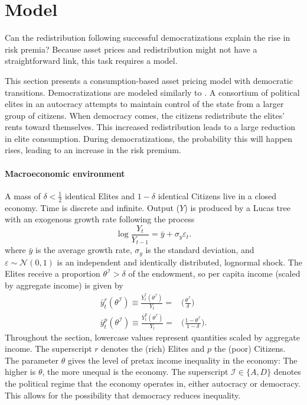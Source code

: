 \section{Model}\label{section:model}
Can the redistribution following successful democratizations explain the rise in risk premia? Because asset prices and redistribution might not have a straightforward link, this task requires a model.

This section presents a consumption-based asset pricing model with democratic transitions. Democratizations are modeled similarly to \cite{Acemoglu2006}.  A consortium of political elites in an autocracy attempts to maintain control of the state from a larger group of citizens. When democracy comes, the citizens redistribute the elites' rents toward themselves. This increased redistribution leads to a large reduction in elite consumption. During democratizations, the probability this will happen rises, leading to an increase in the risk premium.

\paragraph{Macroeconomic environment}
A mass of $\delta<\frac{1}{2}$ identical Elites and $1-\delta$ identical Citizens live in a closed economy.  Time is discrete and infinite.  Output ($Y$) is produced by a Lucas tree with an exogenous growth rate following the process
\begin{equation}
\log \frac{Y_{t}}{Y_{t-1}}=\bar{y}+\sigma_y \varepsilon_{t}.\label{eq:endowment}
\end{equation}
where $\bar{y}$ is the average growth rate, $\sigma_y$ is the standard deviation, and $\varepsilon \sim \mathcal{N}(0,1)$ is an independent and identically distributed, lognormal shock.  The Elites receive a proportion $\theta^\mathcal{I}>\delta$ of the endowment, so per capita income (scaled by aggregate income) is given by
\begin{align}
\bar{y}_{t}^{r}(\theta^{\mathcal{I}}) \equiv \frac{\bar{Y}_{t}^{r}(\theta^{\mathcal{I}})}{Y_t}= & \bigg(\frac{\theta^\mathcal{I}}{\delta}\bigg) \\
\bar{y}_{t}^{p}(\theta^{\mathcal{I}}) \equiv \frac{\bar{Y}_{t}^{p}(\theta^{\mathcal{I}})}{Y_t}= & \bigg(\frac{1-\theta^\mathcal{I}}{1-\delta}\bigg).
\end{align}
Throughout the section, lowercase values represent quantities scaled by aggregate income. The superscript $r$ denotes the (rich) Elites and $p$ the (poor) Citizens. The parameter $\theta$ gives the level of pretax income inequality in the economy: The higher is $\theta$, the more unequal is the economy.  The superscript $\mathcal{I} \in \{A,D\}$ denotes the political regime that the economy operates in,  either autocracy or democracy.  This allows for the possibility that democracy reduces inequality.

